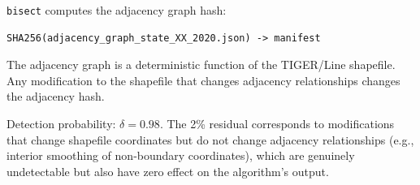 \texttt{bisect} computes the adjacency graph hash:
\begin{verbatim}
SHA256(adjacency_graph_state_XX_2020.json) -> manifest
\end{verbatim}
The adjacency graph is a deterministic function of the TIGER/Line shapefile.
Any modification to the shapefile that changes adjacency relationships
changes the adjacency hash.

Detection probability: $\delta = 0.98$.
The 2\% residual corresponds to modifications that change shapefile
coordinates but do not change adjacency relationships (e.g., interior
smoothing of non-boundary coordinates), which are genuinely undetectable
but also have zero effect on the algorithm's output.
